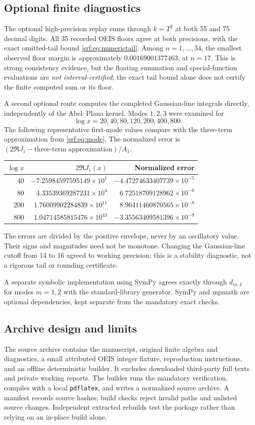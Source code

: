 \documentclass[11pt]{article}
\theoremstyle{remark}\newtheorem{remark}[theorem]{Remark}
\begin{document}
\subsection{Optional finite diagnostics}
The optional high-precision replay sums through $k=T^2$ at both 55 and 75 decimal digits. All 35 recorded OEIS floors agree at both precisions, with the exact omitted-tail bound \eqref{srf:eq:numerictail}. Among $n=1,\ldots,34$, the smallest observed floor margin is approximately $0.00169001377463$, at $n=17$. This is strong consistency evidence, but the floating summation and special-function evaluations are \emph{not interval-certified}; the exact tail bound alone does not certify the finite computed sum or its floor.

A second optional route computes the completed Gaussian-line integrals directly, independently of the Abel--Plana kernel. Modes $1,2,3$ were examined for
\[
 \log x=20,40,80,120,200,400,800.
\]
The following representative first-mode values compare with the three-term approximation from \eqref{srf:eq:mode}. The normalized error is
$(2\Re J_1-\text{three-term approximation})/A_1$.
\begin{center}
\small
\begin{tabular}{rrr}
\toprule
$\log x$ & $2\Re J_1(x)$ & Normalized error\\
\midrule
40 & $-7.25984597595149\times10^1$ & $-4.47274633407739\times10^{-5}$\\
80 & $4.33539369287231\times10^4$ & $6.72518709128962\times10^{-6}$\\
200 & $1.76009902284839\times10^{11}$ & $8.96411460870565\times10^{-8}$\\
800 & $1.04714585815476\times10^{43}$ & $-3.35563409581396\times10^{-9}$\\
\bottomrule
\end{tabular}
\end{center}
The errors are divided by the positive envelope, never by an oscillatory value. Their signs and magnitudes need not be monotone. Changing the Gaussian-line cutoff from 14 to 16 agreed to working precision; this is a stability diagnostic, not a rigorous tail or rounding certificate.

A separate symbolic implementation using SymPy agrees exactly through $d_{m,4}$ for modes $m=1,2$ with the standard-library generator. SymPy and mpmath are optional dependencies, kept separate from the mandatory exact checks.

\subsection{Archive design and limits}
The source archive contains the manuscript, original finite algebra and diagnostics, a small attributed OEIS integer fixture, reproduction instructions, and an offline deterministic builder. It excludes downloaded third-party full texts and private working reports. The builder runs the mandatory verification, compiles with a local \texttt{pdflatex}, and writes a normalized source archive. A manifest records source hashes; build checks reject invalid paths and unlisted source changes. Independent extracted rebuilds test the package rather than relying on an in-place build alone.
\end{document}

